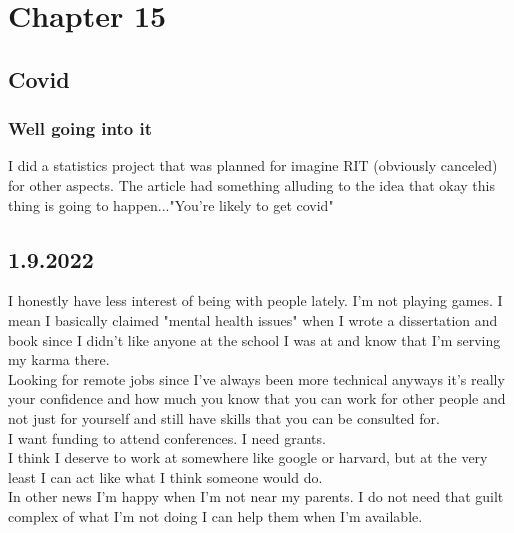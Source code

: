 \chapter{Chapter 15}
\section{Covid}
\subsection{Well going into it}
I did a statistics project that was planned for imagine RIT (obviously canceled) for other aspects. The article had something alluding to the idea that okay this thing is going to happen..."You're likely to get covid" \\ 
\section{1.9.2022}
I honestly have less interest of being with people lately. I'm not playing games. I mean I basically claimed "mental health issues" when I wrote a dissertation and book since I didn't like anyone at the school I was at and know that I'm serving my karma there.
\\
Looking for remote jobs since I've always been more technical anyways it's really your confidence and how much you know that you can work for other people and not just for yourself and still have skills that you can be consulted for. 
\\ 
I want funding to attend conferences. I need grants. \\
I think I deserve to work at somewhere like google or harvard, but at the very least I can act like what I think someone would do. 
\\ 
In other news I'm happy when I'm not near my parents. I do not need that guilt complex of what I'm not doing I can help them when I'm available. 
